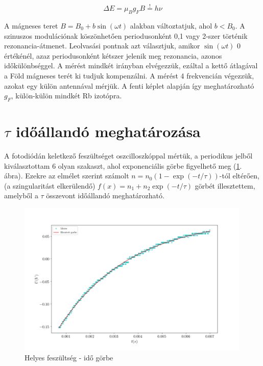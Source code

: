 \documentclass[12pt]{article}
\theoremstyle{plain}
\begin{document}
\vspace{.5cm}

\begin{equation}
\label{eq:2}
\Delta E = \mu_Bg_FB \overset{!}{=}h\nu
\end{equation}

\vspace{.3cm}

\par A mágneses teret $B=B_0+b\sin(\omega t)$ alakban változtatjuk, ahol $b < B_0$. A szinuszos modulációnak köszönhetően periodusonként 0,1 vagy 2-szer történik rezonancia-átmenet. Leolvasási pontnak azt választjuk, amikor $\sin(\omega t)$ 0 értékénél, azaz periodusonként kétszer jelenik meg rezonancia, azonos időkülönbséggel. A mérést mindkét irányban elvégezzük, ezáltal a kettő átlagával a Föld mágneses terét ki tudjuk kompenzálni. A mérést 4 frekvencián végezzük, azokat egy külön antennával mérjük. A fenti képlet alapján így meghatározható $g_F$, külön-külön mindkét Rb izotópra.


\section{$\tau$ időállandó meghatározása}

\par A fotodiódán keletkező feszültséget oszcilloszkóppal mértük, a periodikus jelből kiválasztottam 6 olyan szakaszt,
ahol exponenciális görbe figyelhető meg (\ref{fig:1}. ábra). Ezekre az elmélet szerint számolt $n=n_0(1-\exp(-t/\tau))$-tól eltérően, (a szingularitást
elkerülendő) $f(x)=n_1 + n_2\exp(-t/\tau)$ görbét illesztettem, amelyből a $\tau$ összevont időállandó meghatározható.

\begin{figure}[H]
\centering
\includegraphics[width=0.99\textwidth]{j/tau22.png}
\caption{Helyes feszültség - idő görbe}
  \label{fig:1}
\end{figure}
\end{document}
